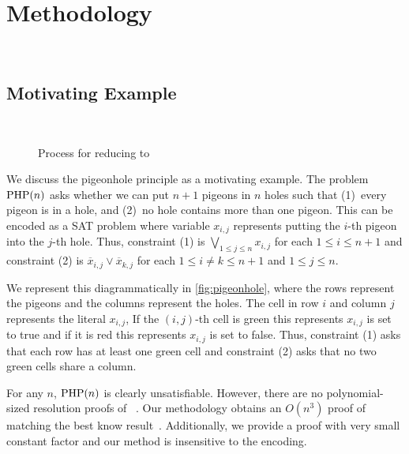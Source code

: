 \section{Methodology}~\label{sec:method}

\subsection{Motivating Example}~\label{sec:motivatex}

\begin{figure*}[!t]
    \centering
    
    \caption{Process for reducing  to }
  \end{figure*}

We discuss the pigeonhole principle as a motivating example. The problem $\mathrm{PHP}(n)$ asks 
whether we can put $n+1$ pigeons in $n$ holes such that (1)~every pigeon is in a 
hole, and (2)~no hole contains more than one pigeon. This can be 
encoded as a SAT problem where variable $x_{i, j}$ represents putting the 
$i$-th pigeon into the $j$-th hole. Thus, constraint (1) is $\bigvee_{1 \leq j \leq n} x_{i, j}$ for each $1 \leq i \leq n+1$ and constraint (2) is $\overline{x}_{i, j} \lor \overline{x}_{k, j}$ for each $ 1 \leq i \neq k \leq n+1$ and $1 \leq j \leq n$.

We represent this diagrammatically in \autoref{fig:pigeonhole}, where the rows represent the pigeons and the columns represent the holes. The cell in row $i$ and column $j$ represents the literal $x_{i, j}$, 
If the $(i, j)$-th cell is green this represents $x_{i, j}$ is set to true and if it is red this represents $x_{i, j}$ is set to false. Thus, constraint (1) asks that each row has at least one green cell and constraint (2) asks that no two green cells share a column.

For any $n$, $\mathrm{PHP}(n)$ is clearly unsatisfiable. However, there are no polynomial-sized resolution proofs of ~\cite{hakenpigeonhole}. Our methodology obtains an $O(n^3)$ \pr proof of  matching the best know result~\cite{prclauses}. Additionally, we provide a proof with very small constant factor and our method is insensitive to the encoding.


